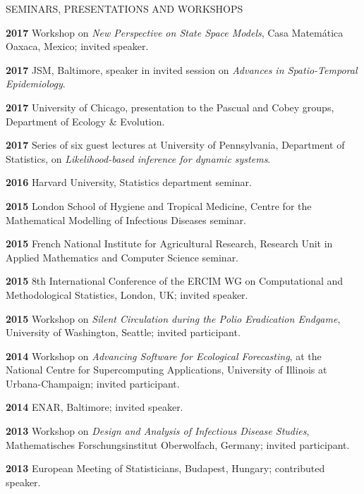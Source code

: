 \begin{mylist}{SEMINARS, PRESENTATIONS AND WORKSHOPS}
\item{\bf 2017 } Workshop on {\it New Perspective on State Space Models}, Casa Matem\'{a}tica Oaxaca, Mexico; invited speaker.

\item{\bf 2017 } JSM, Baltimore, speaker in invited session on {\it Advances in Spatio-Temporal Epidemiology}.

\item{\bf 2017 } University of Chicago, presentation to the Pascual and Cobey groups, Department of Ecology \& Evolution.

\item{\bf 2017 } Series of six guest lectures at University of Pennsylvania, Department of Statistics, on {\it Likelihood-based inference for dynamic systems}.

\item{\bf 2016 } Harvard University, Statistics department seminar.

\item{\bf 2015 } London School of Hygiene and Tropical Medicine, Centre for the Mathematical Modelling of Infectious Diseases seminar.

\item{\bf 2015 } French National Institute for Agricultural Research, Research Unit in Applied Mathematics and Computer Science seminar.

\item{\bf 2015 } 8th International Conference of the ERCIM WG on Computational and Methodological Statistics, London, UK; invited speaker.

\item{\bf 2015 } Workshop on {\it Silent Circulation during the Polio Eradication Endgame}, University of Washington, Seattle; invited participant. 

\item{\bf 2014 } Workshop on {\it Advancing Software for Ecological Forecasting}, at the National Centre for Supercomputing Applications, University of Illinois at Urbana-Champaign; invited participant.

\item{\bf 2014 } ENAR, Baltimore; invited speaker.

\item{\bf 2013 }  Workshop on {\it Design and Analysis of Infectious Disease Studies}, Mathematisches Forschungsinstitut Oberwolfach, Germany; invited participant.

\item{\bf 2013 } European Meeting of Statisticians, Budapest, Hungary; contributed speaker.


\end{mylist}
